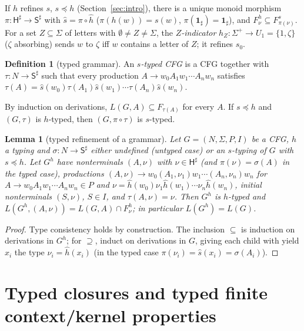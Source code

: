 \documentclass[11pt]{article}
\numberwithin{equation}{section}
\theoremstyle{plain}
\newtheorem{lemma}[theorem]{Lemma}
\theoremstyle{definition}
\newtheorem{definition}[theorem]{Definition}
\theoremstyle{remark}
\theoremstyle{plain}
\newcommand{\one}{\mathbf 1_\sharp}
\begin{document}
If $h$ refines $s$, $s\preceq h$ (Section~\ref{sec:intro}), there is a
unique monoid morphism
$\pi:\mathsf H^\sharp\to\mathsf S^\sharp$ with $\widehat s=\pi\circ\widehat h$
($\pi(h(w))=s(w)$, $\pi(\one)=\one$), and
$F^h_\nu\subseteq F^s_{\pi(\nu)}$.
For a set $Z\subseteq\Sigma$ of letters with $\emptyset\ne Z\ne\Sigma$, the
\emph{$Z$-indicator} $h_Z:\Sigma^+\to U_1=\{1,\zeta\}$ ($\zeta$ absorbing)
sends $w$ to $\zeta$ iff $w$ contains a letter of $Z$; it refines $s_0$.

\begin{definition}[typed grammar]\label{def:typed}
An \emph{$s$-typed CFG} is a CFG together with $\tau:N\to\mathsf S^\sharp$
such that every production $A\to w_0A_1w_1\cdots A_nw_n$ satisfies
$\tau(A)=\widehat s(w_0)\tau(A_1)\widehat s(w_1)\cdots\tau(A_n)\widehat s(w_n)$.
\end{definition}
By induction on derivations, $L(G,A)\subseteq F_{\tau(A)}$ for every $A$.
If $s\preceq h$ and $(G,\tau)$ is $h$-typed, then $(G,\pi\circ\tau)$ is
$s$-typed.

\begin{lemma}[typed refinement of a grammar]\label{lem:product}
Let $G=(N,\Sigma,P,I)$ be a CFG, $h$ a typing and $\sigma:N\to\mathsf S^\sharp$
either undefined (untyped case) or an $s$-typing of $G$ with $s\preceq h$.
Let $G^h$ have nonterminals $(A,\nu)$ with $\nu\in\mathsf H^\sharp$ (and
$\pi(\nu)=\sigma(A)$ in the typed case), productions
$(A,\nu)\to w_0(A_1,\nu_1)w_1\cdots(A_n,\nu_n)w_n$ for
$A\to w_0A_1w_1\cdots A_nw_n\in P$ and
$\nu=\widehat h(w_0)\nu_1\widehat h(w_1)\cdots\nu_n\widehat h(w_n)$, initial nonterminals
$(S,\nu)$, $S\in I$, and $\tau(A,\nu)=\nu$.  Then $G^h$ is $h$-typed and
$L(G^h,(A,\nu))=L(G,A)\cap F^h_\nu$; in particular $L(G^h)=L(G)$.
\end{lemma}
\begin{proof}
Type consistency holds by construction.  The inclusion $\subseteq$ is
induction on derivations in $G^h$; for $\supseteq$, induct on derivations in
$G$, giving each child with yield $x_i$ the type $\nu_i=\widehat h(x_i)$ (in
the typed case $\pi(\nu_i)=\widehat s(x_i)=\sigma(A_i)$).
\end{proof}

\section{Typed closures and typed finite context/kernel properties}
\label{sec:typed}
\end{document}
